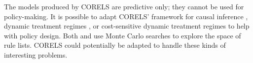 The models produced by CORELS are predictive only; they cannot be used for policy-making. It is possible to adapt CORELS' framework for causal inference \citep{WangRu15CFRL}, dynamic treatment regimes \citep{ZhangEtAl15}, or cost-sensitive dynamic treatment regimes \citep{LakkarajuRu17} to help with policy design. Both \citet{WangRu15} and \citet{LakkarajuRu17} use Monte Carlo searches to explore the space of rule lists. CORELS could potentially be adapted to handle these kinds of interesting problems. 
